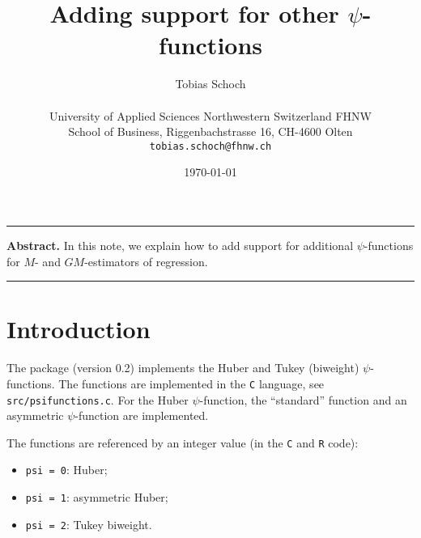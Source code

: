\documentclass[a4paper,oneside,11pt,DIV=12]{scrartcl}
\newcommand{\code}[1]{{\texttt{#1}}}
\begin{document}

\title{Adding support for other $\psi$-functions}

\author{{\normalsize Tobias Schoch} \\
\begin{minipage}[t][][t]{\textwidth}
	\begin{center}
	\small{University of Applied Sciences Northwestern Switzerland FHNW} \\
	\small{School of Business, Riggenbachstrasse 16, CH-4600 Olten} \\
	\small{\texttt{tobias.schoch{@}fhnw.ch}}
	\end{center}
\end{minipage}}

\date{{\small \today}}
\maketitle

\renewenvironment{abstract}{%
\begin{center}\begin{minipage}{0.9\textwidth}
\rule{\textwidth}{0.4pt}
{\sffamily\bfseries\footnotesize Abstract.}\small}
{\par\noindent\rule{\textwidth}{0.4pt}\end{minipage}\end{center}}

\begin{abstract}
In this note, we explain how to add support for additional $\psi$-functions
for $M$- and $GM$-estimators of regression.
\end{abstract}

\vspace{1em}


\section{Introduction}
The package (version 0.2) implements the Huber and Tukey (biweight)
$\psi$-functions. The functions are implemented in the \code{C} language,
see \code{src/psifunctions.c}. For the Huber $\psi$-function, the
``standard'' function and an asymmetric $\psi$-function are implemented.

The functions are referenced by an integer value (in the \code{C}
and \code{R} code):
\begin{itemize}
    \item \code{psi = 0}: Huber;
    \item \code{psi = 1}: asymmetric Huber;
    \item \code{psi = 2}: Tukey biweight.
\end{itemize}
\end{document}
